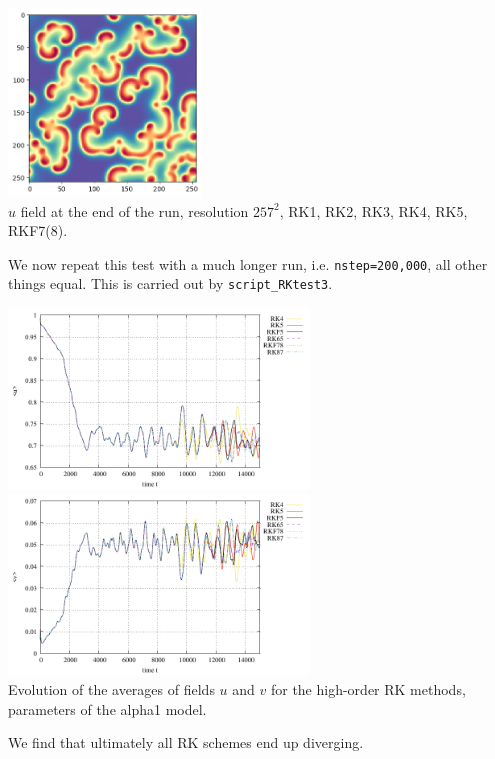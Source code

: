 \begin{center}
\includegraphics[height=5cm]{python_codes/fieldstone_171/RKtest2/alpha1_solution_final_u_RKF78.png}\\
{\captionfont $u$ field at the end of the run, resolution $257^2$, RK1, RK2, RK3, RK4, RK5, RKF7(8).}
\end{center}

We now repeat this test with a much longer run, i.e. \lstinline{nstep=200,000}, 
all other things equal. This is carried out by {\tt script\_RKtest3}.

\begin{center}
\includegraphics[width=8cm]{python_codes/fieldstone_171/RKtest3/avrg_u.pdf}
\includegraphics[width=8cm]{python_codes/fieldstone_171/RKtest3/avrg_v.pdf}\\
{\captionfont Evolution of the averages of fields $u$
and $v$ for the high-order RK methods, parameters of the alpha1 model.}
\end{center}

We find that ultimately all RK schemes end up diverging.





